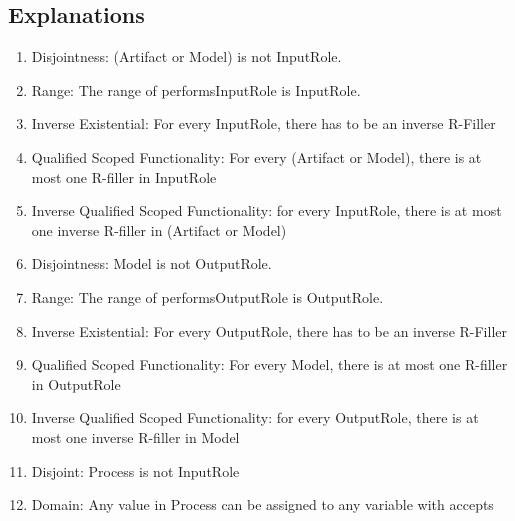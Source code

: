 \subsection{Explanations}
\label{exp:2b}
\begin{enumerate}
    \item  Disjointness: \textsf{(Artifact or Model)} is not \textsf{InputRole}.
    \item  Range: The range of \textsf{performsInputRole} is \textsf{InputRole}. 
    \item   Inverse Existential: For every \textsf{InputRole}, there has to be an inverse R-Filler %
    \item  Qualified Scoped Functionality: For every \textsf{(Artifact or Model)}, there is at most one R-filler in \textsf{InputRole} %
    \item  Inverse Qualified Scoped Functionality: for every \textsf{InputRole}, there is at most one inverse R-filler in \textsf{(Artifact or Model)} %
    \item  Disjointness: \textsf{Model} is not \textsf{OutputRole}.
    \item  Range: The range of \textsf{performsOutputRole} is \textsf{OutputRole}. 
    \item   Inverse Existential: For every \textsf{OutputRole}, there has to be an inverse R-Filler %
    \item  Qualified Scoped Functionality: For every \textsf{Model}, there is at most one R-filler in \textsf{OutputRole} %
    \item  Inverse Qualified Scoped Functionality: for every \textsf{OutputRole}, there is at most one inverse R-filler in \textsf{Model} %
    \item Disjoint: \textsf{Process} is not \textsf{InputRole}  %
    \item Domain: Any value in \textsf{Process} can be assigned to any variable with \textsf{accepts} %

\end{enumerate}
